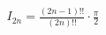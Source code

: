 \documentclass[preview]{standalone}
\begin{document}
\begin{align*}
I_{2n} = \frac{(2n-1)!!}{(2n)!!} \cdot \frac{\pi}{2}
\end{align*}
\end{document}
